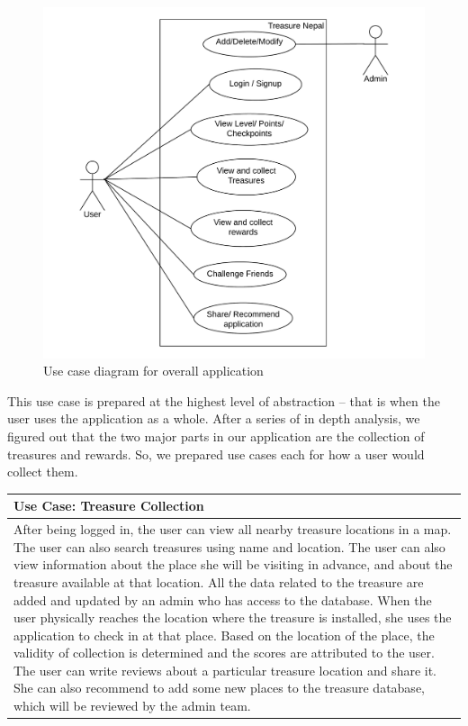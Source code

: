 \documentclass[12pt, a4paper, oneside]{article}
\begin{document}
\begin{figure}[h!]
\includegraphics[width=\linewidth]{use-case-diagrams/all.png}
\centering
\caption{Use case diagram for overall application}
\label{fig:use-case-all}
\end{figure}

\vspace{200px}
This use case is prepared at the highest level of abstraction -- that is when the user uses the application as a whole. After a series of in depth analysis, we figured out that the two major parts in our application are the collection of treasures and rewards. So, we prepared use cases each for how a user would collect them.

\begin{table}[h!]
\centering
\begin{tabularx}{\linewidth}{|X|} 
\hline
\textbf{Use Case:  Treasure Collection}\\ 
\hline
After being logged in, the user can view all nearby treasure locations in a map. The user can also search treasures using name and location.  The user can also view information about the place she will be visiting in advance, and about the treasure available at that location. All the data related to the treasure are added and updated by an admin who has access to the database. When the user physically reaches the location where the treasure is installed, she uses the application to check in at that place. Based on the location of the place, the validity of collection is determined and the scores are attributed to the user. The user can write reviews about a particular treasure location and share it. She can also recommend to add some new places to the treasure database, which will be reviewed by the admin team.\\
\hline
\end{tabularx}
\end{table}
\end{document}
